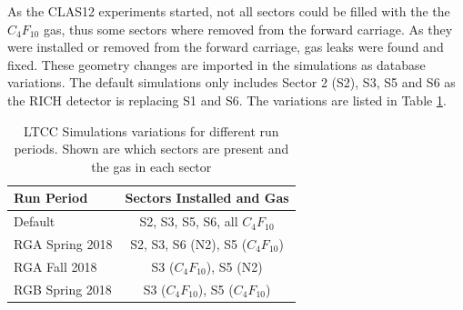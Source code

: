 As the CLAS12 experiments started, not all sectors could be filled with the the $C_4F_{10}$ gas, thus some sectors where removed from the
forward carriage. As they were installed or removed from the forward carriage, gas leaks were found and fixed. These geometry changes are imported in the simulations as database
variations. The default simulations only includes Sector 2 (S2), S3, S5 and S6 as the RICH detector is replacing S1 and S6.
The variations are listed in Table \ref{tab:simVariations}.

\begin{table}
	\begin{center}
		\begin{tabular}{| l | c |}
			\hline \hline
			Run Period       & Sectors Installed and Gas \\
			\hline
			Default          & S2, S3, S5, S6, all $C_4F_{10}$    \\
			RGA Spring 2018  & S2, S3, S6 (N2), S5 ($C_4F_{10}$)  \\
			RGA Fall 2018    & S3 ($C_4F_{10}$), S5 (N2)          \\
			RGB Spring 2018  & S3 ($C_4F_{10}$), S5 ($C_4F_{10}$) \\
			\hline \hline
		\end{tabular}
	\end{center}
	\caption{LTCC Simulations variations for different run periods. Shown are which sectors are present and the gas in each sector}
	\label{tab:simVariations}
\end{table}






